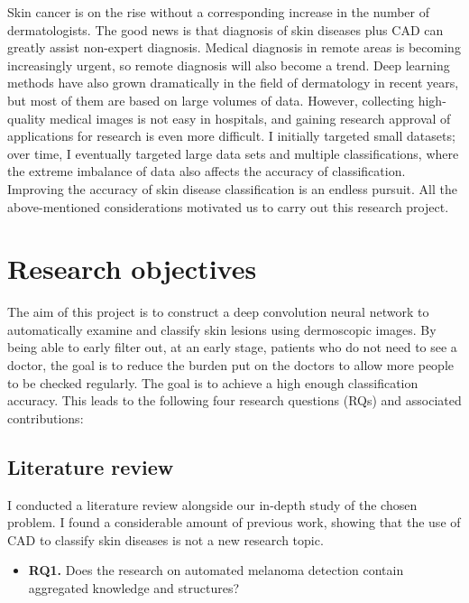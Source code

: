 Skin cancer is on the rise without a corresponding increase in the number of dermatologists. The good news is that diagnosis of skin diseases plus CAD can greatly assist non-expert diagnosis. Medical diagnosis in remote areas is becoming increasingly urgent, so remote diagnosis will also become a trend. Deep learning methods have also grown dramatically in the field of dermatology in recent years, but most of them are based on large volumes of data. However, collecting high-quality medical images is not easy in hospitals, and gaining research approval of applications for research is even more difficult. I initially targeted small datasets; over time, I eventually targeted large data sets and multiple classifications, where the extreme imbalance of data also affects the accuracy of classification. Improving the accuracy of skin disease classification is an endless pursuit. All the above-mentioned considerations motivated us to carry out this research project.



\section{Research objectives} \label{sec.questions}

The aim of this project is to construct a deep convolution neural network to automatically examine and classify skin lesions using dermoscopic images. By being able to early filter out, at an early stage, patients who do not need to see a doctor, the goal is to reduce the burden put on the doctors to allow more people to be checked
regularly.  The goal is to achieve a high enough classification accuracy. This leads to the following four research questions (RQs) and associated contributions:

\subsection{Literature review}
I conducted a literature review alongside our in-depth study of the chosen problem. I found a considerable amount of previous work, showing that the use of CAD to classify skin diseases is not a new research topic.  
\begin{itemize} \label{sec.rq1}
    \item \textbf{RQ1.} Does the research on automated melanoma detection contain aggregated knowledge and structures?
\end{itemize}

